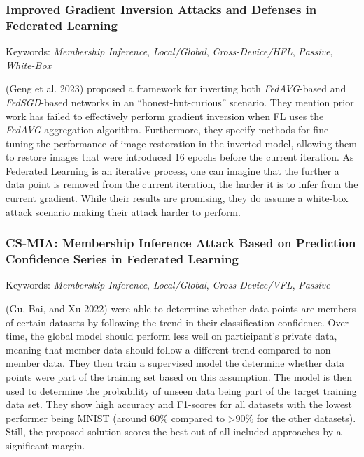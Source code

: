 \hypertarget{improved-gradient-inversion-attacks-and-defenses-in-federated-learning}{%
\subsubsection{Improved Gradient Inversion Attacks and Defenses in
Federated
Learning}\label{improved-gradient-inversion-attacks-and-defenses-in-federated-learning}}

Keywords: \emph{Membership Inference}, \emph{Local/Global},
\emph{Cross-Device/HFL}, \emph{Passive}, \emph{White-Box}

(Geng et al. 2023) proposed a framework for inverting both
\emph{FedAVG}-based and \emph{FedSGD}-based networks in an
``honest-but-curious'' scenario. They mention prior work has failed to
effectively perform gradient inversion when FL uses the \emph{FedAVG}
aggregation algorithm. Furthermore, they specify methods for fine-tuning
the performance of image restoration in the inverted model, allowing
them to restore images that were introduced 16 epochs before the current
iteration. As Federated Learning is an iterative process, one can
imagine that the further a data point is removed from the current
iteration, the harder it is to infer from the current gradient. While
their results are promising, they do assume a white-box attack scenario
making their attack harder to perform.

\hypertarget{cs-mia-membership-inference-attack-based-on-prediction-confidence-series-in-federated-learning}{%
\subsubsection{CS-MIA: Membership Inference Attack Based on Prediction
Confidence Series in Federated
Learning}\label{cs-mia-membership-inference-attack-based-on-prediction-confidence-series-in-federated-learning}}

Keywords: \emph{Membership Inference}, \emph{Local/Global},
\emph{Cross-Device/VFL}, \emph{Passive}

(Gu, Bai, and Xu 2022) were able to determine whether data points are
members of certain datasets by following the trend in their
classification confidence. Over time, the global model should perform
less well on participant's private data, meaning that member data should
follow a different trend compared to non-member data. They then train a
supervised model the determine whether data points were part of the
training set based on this assumption. The model is then used to
determine the probability of unseen data being part of the target
training data set. They show high accuracy and F1-scores for all
datasets with the lowest performer being MNIST (around 60\% compared to
\textgreater90\% for the other datasets). Still, the proposed solution
scores the best out of all included approaches by a significant margin.

